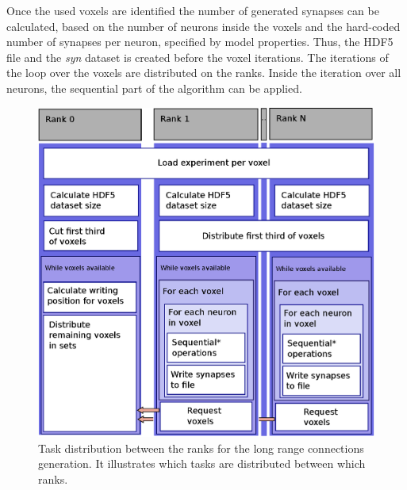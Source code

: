 Once the used voxels are identified the number of generated synapses can be calculated, based on the
number of neurons inside the voxels and the hard-coded number of synapses per neuron, specified by model properties.
Thus, the HDF5 file and the \emph{syn} dataset is created before the voxel iterations.
The iterations of the loop over the voxels are distributed on the ranks.
Inside the iteration over all neurons, the sequential part of the algorithm can be applied.
\begin{figure}[ht!]
\centering
\includegraphics[scale=0.5]{pictures/longRange_parallelAlg.eps}
\caption[Task distribution between the ranks for the long range connections generation]{Task distribution between the ranks for the long range connections generation. It illustrates which tasks are distributed between which ranks.}
\label{fig:longrangParallel}
\end{figure}

